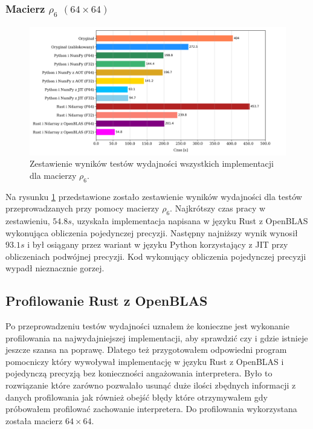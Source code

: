 \documentclass[11pt, a4paper]{article}
\begin{document}
\begin{sloppypar}
    \subsubsection{Macierz \texorpdfstring{$\rho_{6}$ $(64\times64)$}{rho6 64x64}}
    \begin{figure}[ht]
      \centering
      \includegraphics[width=1.0\textwidth]{"resources/rho_6_matrix_comparison.png"}
      \caption{Zestawienie wyników testów wydajności wszystkich implementacji dla macierzy $\rho
      _{6}$.}
      \label{matrix-comparison-rho-6-plot}
    \end{figure}
    Na rysunku \ref{matrix-comparison-rho-6-plot} przedstawione zostało zestawienie wyników
    wydajności dla testów przeprowadzanych przy pomocy macierzy $\rho_{6}$. Najkrótszy
    czas pracy w zestawieniu, $54.8s$, uzyskała implementacja napisana w języku Rust z
    OpenBLAS wykonująca obliczenia pojedynczej precyzji. Następny najniższy wynik wynosił
    $93.1s$ i był osiągany przez wariant w języku Python korzystający z JIT przy obliczeniach
    podwójnej precyzji. Kod wykonujący obliczenia pojedynczej precyzji wypadł
    nieznacznie gorzej.

    \FloatBarrier

    \subsection{Profilowanie Rust z OpenBLAS}


    Po przeprowadzeniu testów wydajności uznałem że konieczne jest wykonanie profilowania
    na najwydajniejszej implementacji, aby sprawdzić czy i gdzie istnieje jeszcze szansa
    na poprawę. Dlatego też przygotowałem odpowiedni program pomocniczy który wywoływał implementację
    w języku Rust z OpenBLAS i pojedynczą precyzją bez konieczności angażowania interpretera.
    Było to rozwiązanie które zarówno pozwalało usunąć duże ilości zbędnych informacji z
    danych profilowania jak również obejść błędy które otrzymywałem gdy próbowałem
    profilować zachowanie interpretera. Do profilowania wykorzystana została macierz $64\times
    64$.


\end{sloppypar}
\end{document}
